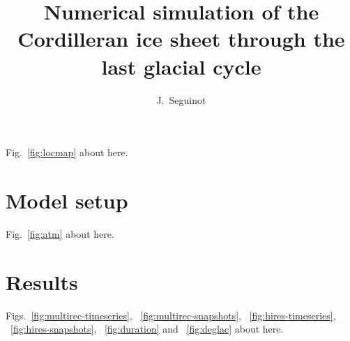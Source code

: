 \documentclass[tc, ms]{copernicus}
\begin{document}
\hack{\sloppy}

\title{Numerical simulation of the Cordilleran ice sheet through the last glacial cycle}

\author[1,2]{J.~Seguinot}



\received{}
\accepted{}
\published{}

\maketitle

\begin{abstract}
\end{abstract}


\introduction
\label{sec:intro}

Fig.~\ref{fig:locmap} about here.

\section{Model setup}
\label{sec:model}

Fig.~\ref{fig:atm} about here.

\section{Results}
\label{sec:results}

Figs.~\ref{fig:multirec-timeseries}, ~\ref{fig:multirec-snapshots},
~\ref{fig:hires-timeseries}, ~\ref{fig:hires-snapshots},
~\ref{fig:duration} and ~\ref{fig:deglac} about here.
\end{document}
